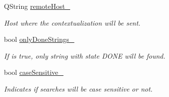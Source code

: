 \begin{DoxyCompactItemize}
Q\+String \mbox{\hyperlink{classContextualizationController_afdc03867fd96587139618c736c350ead}{remote\+Host\+\_\+}}
\begin{DoxyCompactList}\small\item\em Host where the contextualization will be sent. \end{DoxyCompactList}\item 
\mbox{\label{classContextualizationController_a8313b2b6332dd76f286e5f24a6329b02}} 
bool \mbox{\hyperlink{classContextualizationController_a8313b2b6332dd76f286e5f24a6329b02}{only\+Done\+Strings\+\_\+}}
\begin{DoxyCompactList}\small\item\em If is true, only string with state D\+O\+NE will be found. \end{DoxyCompactList}\item 
\mbox{\label{classContextualizationController_a2ac26ea74b41512a52f677ac6c8fa83f}} 
bool \mbox{\hyperlink{classContextualizationController_a2ac26ea74b41512a52f677ac6c8fa83f}{case\+Sensitive\+\_\+}}
\begin{DoxyCompactList}\small\item\em Indicates if searches will be case sensitive or not. \end{DoxyCompactList}\end{DoxyCompactItemize}

